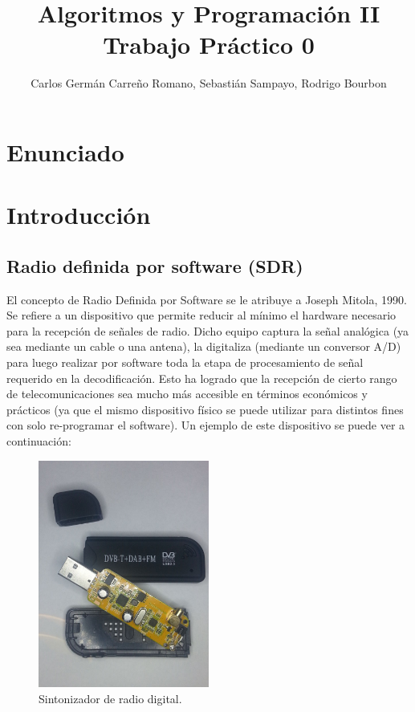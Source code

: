 \documentclass[10pt,a4paper]{article}
\title{Algoritmos y Programación II\\
Trabajo Práctico 0}
\author{Carlos Germán Carreño Romano, Sebastián Sampayo, Rodrigo Bourbon}
\begin{document}
\maketitle
\tableofcontents
\section{Enunciado}
\section{Introducción}


\subsection{Radio definida por software (SDR)}

El concepto de Radio Definida por Software se le atribuye a Joseph Mitola, 1990. Se refiere a un dispositivo que permite reducir al mínimo el hardware necesario para la recepción de señales de radio. Dicho equipo captura la señal analógica (ya sea mediante un cable o una antena), la digitaliza (mediante un conversor A/D) para luego realizar por software toda la etapa de procesamiento de señal requerido en la decodificación. Esto ha logrado que la recepción de cierto rango de telecomunicaciones sea mucho más accesible en términos económicos y prácticos (ya que el mismo dispositivo físico se puede utilizar para distintos fines con solo re-programar el software). Un ejemplo de este dispositivo se puede ver a continuación:

\begin{figure}
\begin{centering}
\includegraphics[width=0.5\textwidth]{Imagenes/SDR.jpg}
\par\end{centering}

\caption{Sintonizador de radio digital.}


\end{figure}
\end{document}

